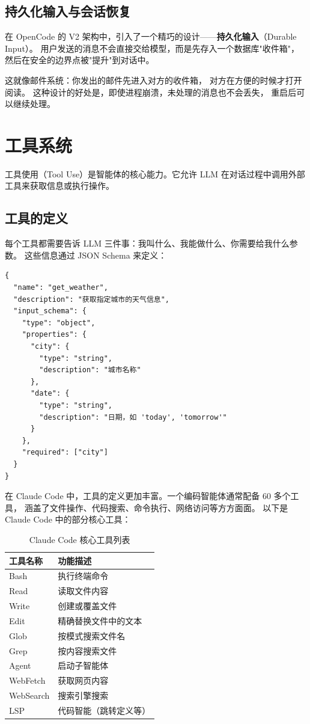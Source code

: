 \subsection{持久化输入与会话恢复}

在 OpenCode 的 V2 架构中，引入了一个精巧的设计——\textbf{持久化输入}（Durable Input）。
用户发送的消息不会直接交给模型，而是先存入一个数据库"收件箱"，
然后在安全的边界点被"提升"到对话中。

这就像邮件系统：你发出的邮件先进入对方的收件箱，
对方在方便的时候才打开阅读。
这种设计的好处是，即使进程崩溃，未处理的消息也不会丢失，
重启后可以继续处理。

\section{工具系统}

工具使用（Tool Use）是智能体的核心能力。它允许 LLM 在对话过程中调用外部工具来获取信息或执行操作。

\subsection{工具的定义}

每个工具都需要告诉 LLM 三件事：我叫什么、我能做什么、你需要给我什么参数。
这些信息通过 JSON Schema 来定义：

\begin{verbatim}
{
  "name": "get_weather",
  "description": "获取指定城市的天气信息",
  "input_schema": {
    "type": "object",
    "properties": {
      "city": {
        "type": "string",
        "description": "城市名称"
      },
      "date": {
        "type": "string",
        "description": "日期，如 'today', 'tomorrow'"
      }
    },
    "required": ["city"]
  }
}
\end{verbatim}

在 Claude Code 中，工具的定义更加丰富。一个编码智能体通常配备 60 多个工具，
涵盖了文件操作、代码搜索、命令执行、网络访问等方方面面。
以下是 Claude Code 中的部分核心工具：

\begin{table}[H]
    \centering
    \begin{tabular}{|l|l|}
        \hline
        \textbf{工具名称} & \textbf{功能描述} \\
        \hline
        Bash & 执行终端命令 \\
        Read & 读取文件内容 \\
        Write & 创建或覆盖文件 \\
        Edit & 精确替换文件中的文本 \\
        Glob & 按模式搜索文件名 \\
        Grep & 按内容搜索文件 \\
        Agent & 启动子智能体 \\
        WebFetch & 获取网页内容 \\
        WebSearch & 搜索引擎搜索 \\
        LSP & 代码智能（跳转定义等） \\
        \hline
    \end{tabular}
    \caption{Claude Code 核心工具列表}
\end{table}


